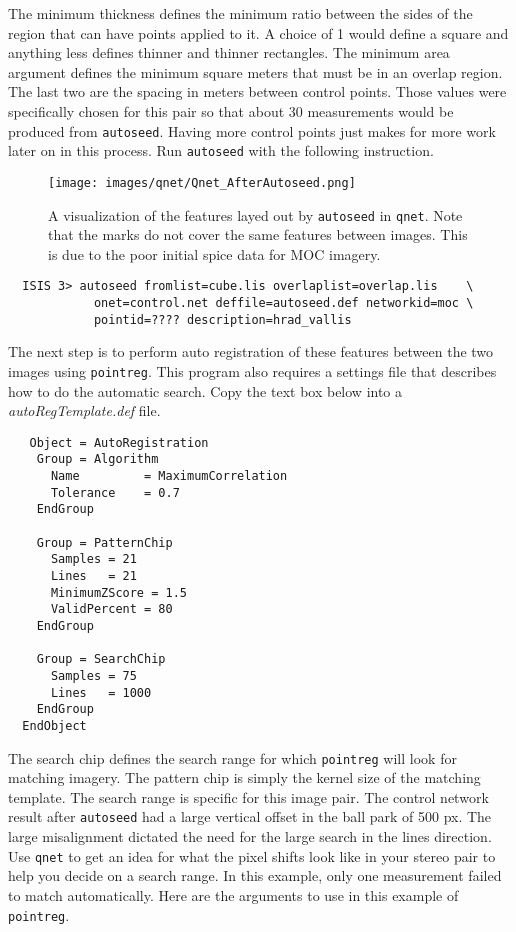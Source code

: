 The minimum thickness defines the minimum ratio between the sides of
the region that can have points applied to it. A choice of 1 would
define a square and anything less defines thinner and thinner
rectangles. The minimum area argument defines the minimum square
meters that must be in an overlap region. The last two are the spacing
in meters between control points. Those values were specifically
chosen for this pair so that about 30 measurements would be produced
from \texttt{autoseed}. Having more control points just makes for more
work later on in this process. Run \texttt{autoseed} with the
following instruction.

\begin{figure}[ht]
  \centering
  \texttt{[image: images/qnet/Qnet\_AfterAutoseed.png]}
  \caption{A visualization of the features layed out by
    \texttt{autoseed} in \texttt{qnet}. Note that the marks do not
    cover the same features between images. This is due to the poor
    initial spice data for MOC imagery.}
  \label{fig:after_autoseed}
\end{figure}

\begin{verbatim}
  ISIS 3> autoseed fromlist=cube.lis overlaplist=overlap.lis    \
            onet=control.net deffile=autoseed.def networkid=moc \
            pointid=???? description=hrad_vallis
\end{verbatim}

The next step is to perform auto registration of these features
between the two images using \texttt{pointreg}. This program also
requires a settings file that describes how to do the automatic
search. Copy the text box below into a \textit{autoRegTemplate.def}
file.

\begin{verbatim}
   Object = AutoRegistration
    Group = Algorithm
      Name         = MaximumCorrelation
      Tolerance    = 0.7
    EndGroup

    Group = PatternChip
      Samples = 21
      Lines   = 21
      MinimumZScore = 1.5
      ValidPercent = 80
    EndGroup

    Group = SearchChip
      Samples = 75
      Lines   = 1000
    EndGroup
  EndObject
\end{verbatim}

The search chip defines the search range for which \texttt{pointreg}
will look for matching imagery. The pattern chip is simply the kernel
size of the matching template. The search range is specific for this
image pair. The control network result after \texttt{autoseed} had a
large vertical offset in the ball park of 500 px. The large
misalignment dictated the need for the large search in the lines
direction. Use \texttt{qnet} to get an idea for what the pixel shifts
look like in your stereo pair to help you decide on a search range. In
this example, only one measurement failed to match automatically. Here
are the arguments to use in this example of \texttt{pointreg}.

